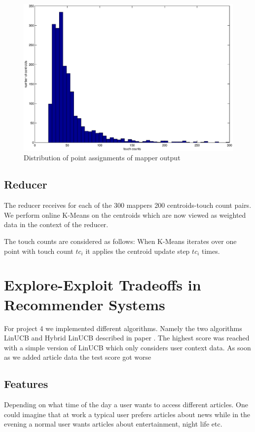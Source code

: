 \documentclass[a4paper, 11pt]{article}
\begin{document}
\begin{figure}[H]
\centering
\includegraphics[scale=0.35]{histogram.eps}
\caption{Distribution of point assignments of mapper output}
\label{fig:proj3-initialisation}
\end{figure}


\subsection{Reducer}
The reducer receives for each of the 300 mappers 200 centroids-touch count pairs. We perform online K-Means on the centroids which are now viewed as weighted data in the context of the reducer.

The touch counts are considered as follows: When K-Means iterates over one point with touch count $tc_i$ it applies the centroid update step $tc_i$ times.

\section{Explore-Exploit Tradeoffs in Recommender Systems}

For project 4 we implemented different algorithms. Namely the two algorithms LinUCB and Hybrid LinUCB described in paper \cite{li2010contextual}. The highest score was reached with a simple version of LinUCB which only considers user context data. As soon as we added article data the test score got worse

\subsection{Features}
Depending on what time of the day a user wants to access different articles. One could imagine that at work a typical user prefers articles about news while in the evening a normal user wants articles about entertainment, night life etc.
\end{document}
